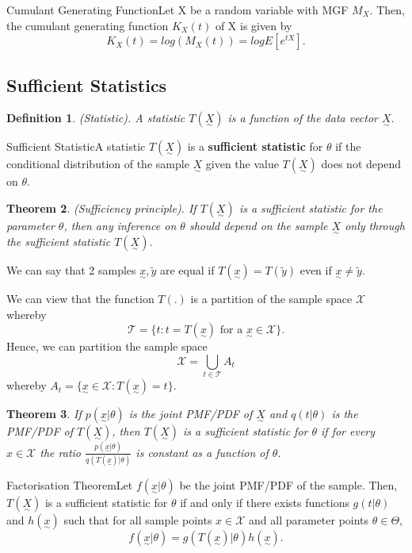 \documentclass[twoside]{article}
\newcounter{lecnum}
\newtheorem{theorem}{Theorem}[lecnum]
\newtheorem{definition}[theorem]{Definition}
\newcommand{\utilde}{\underset{\sim}}
\begin{document}
\begin{definition_exam}{Cumulant Generating Function}{}Let X be a random variable with MGF $M_X.$ Then, the cumulant generating function $K_X(t)$ of X is given by 
$$
K_X(t) = log(M_X(t)) = logE[e^{tX}].
$$
\end{definition_exam}


\subsection{Sufficient Statistics}
\begin{definition}(Statistic). A statistic $T(\utilde{X})$ is a function of the data vector $\utilde{X}.$
\end{definition}

\begin{definition_exam}{Sufficient Statistic}{}A statistic $T(\utilde{X})$ is a \textbf{sufficient statistic} for $\theta$ if the conditional distribution of the sample $\utilde{X}$ given the value $T(\utilde{X})$ does not depend on $\theta.$
\end{definition_exam}

\begin{theorem}(Sufficiency principle). If $T(\utilde{X})$ is a sufficient statistic for the parameter $\theta$, then any inference on $\theta$ should depend on the sample $\utilde{X}$ only through the sufficient statistic $T(\utilde{X}).$
\end{theorem}

We can say that 2 samples $\utilde{x}, \tilde{y}$ are equal if $T(\utilde{x}) = T(\tilde{y})$ even if $\utilde{x} \neq \tilde{y}.$

We can view that the function $T(.)$ is a partition of the sample space $\mathcal{X}$ whereby 
$$
\mathcal{T} = \{t: t = T(\utilde{x}) \text{ for a } \utilde{x} \in \mathcal{X}\}.
$$
Hence, we can partition the sample space 
$$
\mathcal{X} = \bigcup_{t \in \mathcal{T}}A_t
$$
whereby $A_t = \{\utilde{x} \in \mathcal{X}: T(\utilde{x}) = t\}$.

\begin{theorem}If $p(\utilde{x}|\theta)$ is the joint PMF/PDF of $\utilde{X}$ and $q(t|\theta)$ is the PMF/PDF of $T(\utilde{X})$, then $T(\utilde{X})$ is a sufficient statistic for $\theta$ if for every $x \in \mathcal{X}$ the ratio $\frac{p(\utilde{x}|\theta)}{q(T(\utilde{x})|\theta)}$ is constant as a function of $\theta.$
\end{theorem}


\begin{theorem_exam}{Factorisation Theorem}{}Let $f(\utilde{x}|\theta)$ be the joint PMF/PDF of the sample. Then, $T(\utilde{X})$ is a sufficient statistic for $\theta$ if and only if there exists functions $g(t|\theta)$ and $h(\utilde{x})$ such that for all sample points $x \in \mathcal{X}$ and all parameter points $\theta \in \Theta$, 
$$
f(\utilde{x}|\theta) = g(T(\utilde{x})|\theta)h(\utilde{x}).
$$
\end{theorem_exam}
\end{document}
